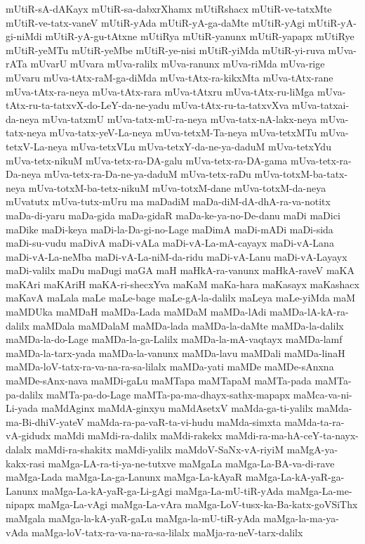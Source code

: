{mUtiR-sA-dAKayx
mUtiR-sa-dabxrXhamx
mUtiRshacx
mUtiR-ve-tatxMte
mUtiR-ve-tatx-vaneV
mUtiR-yAda
mUtiR-yA-ga-daMte
mUtiR-yAgi
mUtiR-yA-gi-niMdi
mUtiR-yA-gu-tAtxne
mUtiRya
mUtiR-yanunx
mUtiR-yapapx
mUtiRye
mUtiR-yeMTu
mUtiR-yeMbe
mUtiR-ye-nisi
mUtiR-yiMda
mUtiR-yi-ruva
mUva-rATa
mUvarU
mUvara
mUva-ralilx
mUva-ranunx
mUva-riMda
mUva-rige
mUvaru
mUva-tAtx-raM-ga-diMda
mUva-tAtx-ra-kikxMta
mUva-tAtx-rane
mUva-tAtx-ra-neya
mUva-tAtx-rara
mUva-tAtxru
mUva-tAtx-ru-liMga
mUva-tAtx-ru-ta-tatxvX-do-LeY-da-ne-yadu
mUva-tAtx-ru-ta-tatxvXva
mUva-tatxai-da-neya
mUva-tatxmU
mUva-tatx-mU-ra-neya
mUva-tatx-nA-lakx-neya
mUva-tatx-neya
mUva-tatx-yeV-La-neya
mUva-tetxM-Ta-neya
mUva-tetxMTu
mUva-tetxV-La-neya
mUva-tetxVLu
mUva-tetxY-da-ne-ya-daduM
mUva-tetxYdu
mUva-tetx-nikuM
mUva-tetx-ra-DA-galu
mUva-tetx-ra-DA-gama
mUva-tetx-ra-Da-neya
mUva-tetx-ra-Da-ne-ya-daduM
mUva-tetx-raDu
mUva-totxM-ba-tatx-neya
mUva-totxM-ba-tetx-nikuM
mUva-totxM-dane
mUva-totxM-da-neya
mUvatutx
mUva-tutx-mUru
ma
maDadiM
maDa-diM-dA-dhA-ra-va-notitx
maDa-di-yaru
maDa-gida
maDa-gidaR
maDa-ke-ya-no-De-danu
maDi
maDici
maDike
maDi-keya
maDi-la-Da-gi-no-Lage
maDimA
maDi-mADi
maDi-sida
maDi-su-vudu
maDivA
maDi-vALa
maDi-vA-La-mA-cayayx
maDi-vA-Lana
maDi-vA-La-neMba
maDi-vA-La-niM-da-ridu
maDi-vA-Lanu
maDi-vA-Layayx
maDi-valilx
maDu
maDugi
maGA
maH
maHkA-ra-vanunx
maHkA-raveV
maKA
maKAri
maKAriH
maKA-ri-shecxYva
maKaM
maKa-hara
maKasayx
maKashacx
maKavA
maLala
maLe
maLe-bage
maLe-gA-la-dalilx
maLeya
maLe-yiMda
maM
maMDUka
maMDaH
maMDa-Lada
maMDaM
maMDa-lAdi
maMDa-lA-kA-ra-dalilx
maMDala
maMDalaM
maMDa-lada
maMDa-la-daMte
maMDa-la-dalilx
maMDa-la-do-Lage
maMDa-la-ga-Lalilx
maMDa-la-mA-vaqtayx
maMDa-lamf
maMDa-la-tarx-yada
maMDa-la-vanunx
maMDa-lavu
maMDali
maMDa-linaH
maMDa-loV-tatx-ra-va-na-ra-sa-lilalx
maMDa-yati
maMDe
maMDe-sAnxna
maMDe-sAnx-nava
maMDi-gaLu
maMTapa
maMTapaM
maMTa-pada
maMTa-pa-dalilx
maMTa-pa-do-Lage
maMTa-pa-ma-dhayx-sathx-mapapx
maMca-va-ni-Li-yada
maMdAginx
maMdA-ginxyu
maMdAsetxV
maMda-ga-ti-yalilx
maMda-ma-Bi-dhiV-yateV
maMda-ra-pa-vaR-ta-vi-hudu
maMda-simxta
maMda-ta-ra-vA-gidudx
maMdi
maMdi-ra-dalilx
maMdi-rakekx
maMdi-ra-ma-hA-ceY-ta-nayx-dalalx
maMdi-ra-shakitx
maMdi-yalilx
maMdoV-SaNx-vA-riyiM
maMgA-ya-kakx-rasi
maMga-LA-ra-ti-ya-ne-tutxve
maMgaLa
maMga-La-BA-va-di-rave
maMga-Lada
maMga-La-ga-Lanunx
maMga-La-kAyaR
maMga-La-kA-yaR-ga-Lanunx
maMga-La-kA-yaR-ga-Li-gAgi
maMga-La-mU-tiR-yAda
maMga-La-me-nipapx
maMga-La-vAgi
maMga-La-vAra
maMga-LoV-tusx-ka-Ba-katx-goVSiThx
maMgala
maMga-la-kA-yaR-gaLu
maMga-la-mU-tiR-yAda
maMga-la-ma-ya-vAda
maMga-loV-tatx-ra-va-na-ra-sa-lilalx
maMja-ra-neV-tarx-dalilx
}

